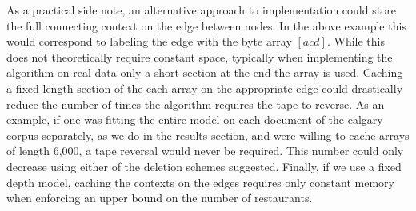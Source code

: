 As a practical side note, an alternative approach to implementation could store the full connecting context on the edge between nodes.  In the above example this would correspond to labeling the edge with the byte array $[acd]$.  While this does not theoretically require constant space, typically when implementing the algorithm on real data only a short section at the end the array is used.  Caching a fixed length section of the each array on the appropriate edge could drastically reduce the number of times the algorithm requires the tape to reverse.  As an example, if one was fitting the entire model on each document of the calgary corpus separately, as we do in the results section, and were willing to cache arrays of length 6,000, a tape reversal would never be required.  This number could only decrease using either of the deletion schemes suggested.  Finally, if we use a fixed depth model, caching the contexts on the edges requires only constant memory when enforcing an upper bound on the number of restaurants.
